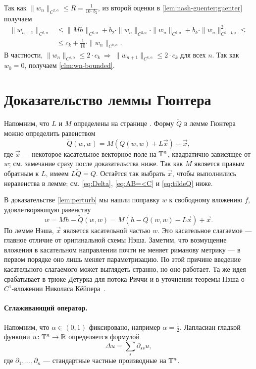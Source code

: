 Так как $\|w_n\|_{C^{2,\alpha}}\le R=\tfrac1{10\cdot b_2}$, из второй оценки в \ref{lem:nash-guenter:guenter} получаем
\begin{align*}
\|w_{n+1}\|_{C^{k,\alpha}}
&\le
\|Mh\|_{C^{k,\alpha}}
+
b_2\cdot \|w_n\|_{C^{2,\alpha}}\cdot \|w_n\|_{C^{k,\alpha}}
+
b_k\cdot \|w_n\|_{C^{k-1,\alpha}}^2\le
\\
&\le c_k +\tfrac1{10}\cdot\|w_n\|_{C^{k,\alpha}}.
\end{align*}
В частности, $\|w_n\|_{C^{k,\alpha}}\le 2\cdot c_k
\ \Rightarrow\ \|w_{n+1}\|_{C^{k,\alpha}}\le 2\cdot c_k$
для всех $n$.
Так как $w_0=0$, получаем \ref{clm:wn-bounded}.
\qeds

\section{Доказательство леммы Гюнтера}\label{sec:proof(gunther)}

Напомним, что $L$ и $M$ определены на странице \pageref{LM}.
Форму $\tilde Q$ в лемме Гюнтера можно определить равенством
\[\tilde Q(w,w)=M(Q(w,w)+L\vec x)-\vec x,\]
где $\vec x$ --- некоторое касательное векторное поле на $\mathbb{T}^n$, квадратично зависящее от $w$;
см. замечание сразу после доказательства ниже.
Так как $M$ является правым обратным к $L$, имеем $L\tilde Q=Q$.
Остаётся так выбрать $\vec x$, чтобы выполнились неравенства в лемме; см. \ref{eq:Delta}, \ref{eq:AB=<C} и \ref{eq:tildeQ} ниже.

В доказательстве \ref{lem:perturb} мы нашли поправку $w$ к свободному вложению $f$, удовлетворяющую равенству
\[w= Mh-\tilde Q(w,w)=M(h-Q(w,w)-L\vec x)+\vec x.\]
По лемме Нэша, $\vec x$ является касательной частью $w$.
Это касательное слагаемое --- главное отличие от оригинальной схемы Нэша.
Заметим, что возмущение вложения в касательном направлении почти не меняет риманову метрику --- в первом порядке оно лишь меняет параметризацию.
По этой причине введение касательного слагаемого может выглядеть странно, но оно работает.
Та же идея срабатывает в трюке Детурка для потока Риччи \cite[2.2]{brendle} и в уточнении теоремы Нэша о $C^1$-вложении Николаса Кёйпера~\cite{kuiper-ru}.

\paragraph{Сглаживающий оператор.}
Напомним, что $\alpha\in(0,1)$ фиксировано, например $\alpha=\tfrac12$.
Лапласиан гладкой функции $u\colon \mathbb{T}^n\to\mathbb{R}$ определяется формулой \label{Du}
\[\Delta u=\sum_s\partial_{ss}u,\]
где $\partial_1,\dots,\partial_n$ --- стандартные частные производные на $\mathbb{T}^n$.

